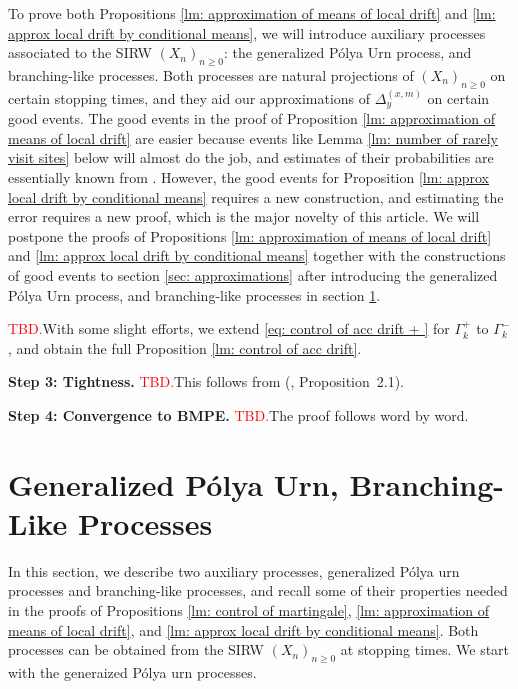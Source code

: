 \documentclass[twoside,12pt,a4paper]{article}
\numberwithin{equation}{section}
\newcommand\TBD{\textcolor{red}{TBD.}}
\begin{document}
	To prove both Propositions \ref{lm: approximation of means of local drift} and \ref{lm: approx local drift by conditional means}, we will introduce auxiliary processes associated to the SIRW $(X_n)_{n\geq 0}$: the generalized P\'{o}lya Urn process, and branching-like processes. Both processes are natural projections of $(X_n)_{n\geq 0}$ on certain stopping times, and they aid our approximations of $\Delta_{y}^{(x,m)}$ on certain good events. The good events in the proof of Proposition \ref{lm: approximation of means of local drift} are easier because events like Lemma \ref{lm: number of rarely visit sites} below will almost do the job, and estimates of their probabilities are essentially known from \cite{KMP22}. However, the good events for Proposition \ref{lm: approx local drift by conditional means} requires a new construction, and estimating the error requires a new proof, which is the major novelty of this article. We will postpone the proofs of Propositions \ref{lm: approximation of means of local drift} and \ref{lm: approx local drift by conditional means} together with the constructions of good events to section \ref{sec: approximations} after introducing the generalized P\'{o}lya Urn process, and branching-like processes in section \ref{sec: generalized Polya Urn, BLP}.
	
	\TBD With some slight efforts, we extend \eqref{eq: control of acc drift + } for $\Gamma_k^+$ to $\Gamma_k^-$, and obtain the full Proposition \ref{lm: control of acc drift}.
	
	
	\textbf{Step 3: Tightness.} \TBD This follows from (\cite{KMP22}, Proposition~2.1).
	
	\textbf{Step 4: Convergence to BMPE.} \TBD The proof follows word by word.
	
	\section{Generalized P\'{o}lya Urn, Branching-Like Processes}\label{sec: generalized Polya Urn, BLP}

	In this section, we describe two auxiliary processes, generalized P\'{o}lya urn processes and branching-like processes, and recall some of their properties needed in the proofs of Propositions \ref{lm: control of martingale}, \ref{lm: approximation of means of local drift}, and \ref{lm: approx local drift by conditional means}. Both processes can be obtained from the SIRW $(X_n)_{n\geq 0}$ at stopping times. We start with the generaized P\'{o}lya urn processes. 
\end{document}
